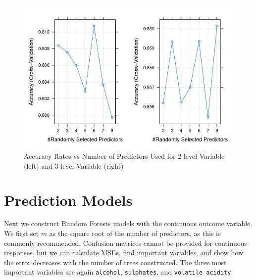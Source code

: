 \documentclass[
]{book}
\begin{document}
\begin{figure}

{\centering \includegraphics[width=1\linewidth,height=1\textheight]{bookdown-demo_files/figure-latex/rfplots-1} 

}

\caption{Accuracy Rates vs Number of Predictors Used for 2-level Variable (left) and 3-level Variable (right)}\label{fig:rfplots}
\end{figure}

\hypertarget{prediction-models}{%
\section{Prediction Models}\label{prediction-models}}

Next we construct Random Forests models with the continuous outcome variable. We first set \(m\) as the square root of the number of predictors, as this is commonly recommended. Confusion matrices cannot be provided for continuous responses, but we can calculate MSEs, find important variables, and show how the error decreases with the number of trees constructed. The three most important variables are again \texttt{alcohol}, \texttt{sulphates}, and \texttt{volatile\ acidity}.
\end{document}

